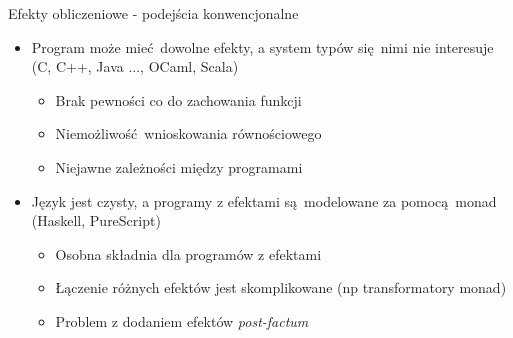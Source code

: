 \documentclass{beamer}
\begin{document}
\begin{frame}{Efekty obliczeniowe - podejścia konwencjonalne}
  \begin{itemize}
    \item Program może mieć dowolne efekty, a system typów się nimi nie interesuje (C, C++, Java ..., OCaml, Scala)
    \begin{itemize}
      \item Brak pewności co do zachowania funkcji
      \item Niemożliwość wnioskowania równościowego
      \item Niejawne zależności między programami
    \end{itemize}
    \item Język jest czysty, a programy z efektami są modelowane za pomocą monad (Haskell, PureScript)
    \begin{itemize}
      \item Osobna składnia dla programów z efektami
      \item Łączenie różnych efektów jest skomplikowane (np transformatory monad)
      \item Problem z dodaniem efektów \textit{post-factum}
    \end{itemize}
  \end{itemize}
\end{frame}
\end{document}
